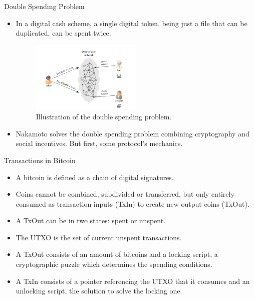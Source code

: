 \documentclass[usenames,dvipsnames]{beamer}
\begin{document}
    \begin{frame}{Double Spending Problem}
        \begin{itemize}
            \item In a digital cash scheme, a \alert{single digital token}, being just a file that can be duplicated, can be \alert{spent twice}. 
            \begin{figure}
            \centering
            \includegraphics[keepaspectratio, height=0.5\textheight, width=0.5\textwidth]{Images/double-spending.png}
            \caption{Illustration of the double spending problem.}
            \end{figure}
            \item Nakamoto solves the \alert{double spending problem} combining \alert{cryptography} and \alert{social incentives}. But first, some protocol's mechanics.
            \end{itemize}
    \end{frame}
    \begin{frame}{Transactions in Bitcoin}
        \begin{itemize}
            \item A \alert{bitcoin} is defined as a chain of digital signatures.
            \item Coins cannot be combined, subdivided or transferred, but only \alert{entirely consumed} as transaction inputs (TxIn) to create new output coins (TxOut).
            \item A TxOut can be in two states: \alert{spent} or \alert{unspent}.
            \item The \alert{UTXO} is the set of current unspent transactions.
            \item A \alert{TxOut} consists of an amount of bitcoins and a \alert{locking script}, a cryptographic puzzle which determines the spending conditions.
            \item A \alert{TxIn} consists of a pointer referencing the UTXO that it consumes and an \alert{unlocking script}, the solution to solve the locking one.
        \end{itemize}
    \end{frame}
    
\end{document}

